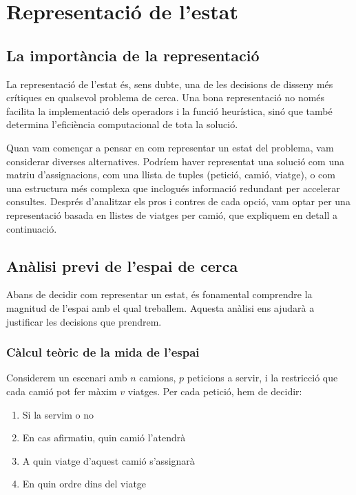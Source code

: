 \section{Representació de l'estat}
\label{sec:state}

\vspace{0.5cm}

\subsection{La importància de la representació}

La representació de l'estat és, sens dubte, una de les decisions de disseny més crítiques en qualsevol problema de cerca. Una bona representació no només facilita la implementació dels operadors i la funció heurística, sinó que també determina l'eficiència computacional de tota la solució. 

Quan vam començar a pensar en com representar un estat del problema, vam considerar diverses alternatives. Podríem haver representat una solució com una matriu d'assignacions, com una llista de tuples (petició, camió, viatge), o com una estructura més complexa que inclogués informació redundant per accelerar consultes. Després d'analitzar els pros i contres de cada opció, vam optar per una representació basada en llistes de viatges per camió, que expliquem en detall a continuació.

\vspace{0.5cm}

\subsection{Anàlisi previ de l'espai de cerca}

Abans de decidir com representar un estat, és fonamental comprendre la magnitud de l'espai amb el qual treballem. Aquesta anàlisi ens ajudarà a justificar les decisions que prendrem.

\vspace{0.5cm}

\subsubsection{Càlcul teòric de la mida de l'espai}

Considerem un escenari amb $n$ camions, $p$ peticions a servir, i la restricció que cada camió pot fer màxim $v$ viatges. Per cada petició, hem de decidir:

\begin{enumerate}
    \item Si la servim o no
    \item En cas afirmatiu, quin camió l'atendrà
    \item A quin viatge d'aquest camió s'assignarà
    \item En quin ordre dins del viatge
\end{enumerate}


